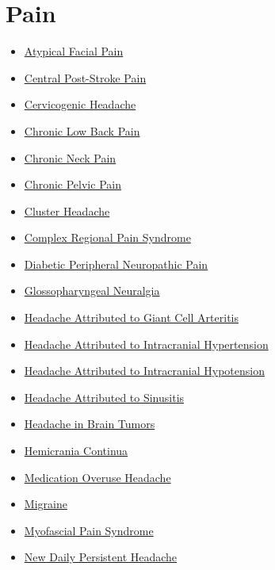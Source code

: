 \section*{Pain}
\label{sec:organ_pain}
\begin{itemize}[noitemsep]
  \item \hyperlink{sec:Atypical Facial Pain}{Atypical Facial Pain}
  \item \hyperlink{sec:Central Post-Stroke Pain}{Central Post-Stroke Pain}
  \item \hyperlink{sec:Cervicogenic Headache}{Cervicogenic Headache}
  \item \hyperlink{sec:Chronic Low Back Pain}{Chronic Low Back Pain}
  \item \hyperlink{sec:Chronic Neck Pain}{Chronic Neck Pain}
  \item \hyperlink{sec:Chronic Pelvic Pain}{Chronic Pelvic Pain}
  \item \hyperlink{sec:Cluster Headache}{Cluster Headache}
  \item \hyperlink{sec:Complex Regional Pain Syndrome}{Complex Regional Pain Syndrome}
  \item \hyperlink{sec:Diabetic Peripheral Neuropathic Pain}{Diabetic Peripheral Neuropathic Pain}
  \item \hyperlink{sec:Glossopharyngeal Neuralgia}{Glossopharyngeal Neuralgia}
  \item \hyperlink{sec:Headache Giant Cell Arteritis}{Headache Attributed to Giant Cell Arteritis}
  \item \hyperlink{sec:Headache Intracranial Hypertension}{Headache Attributed to Intracranial Hypertension}
  \item \hyperlink{sec:Headache Intracranial Hypotension}{Headache Attributed to Intracranial Hypotension}
  \item \hyperlink{sec:Headache Sinusitis}{Headache Attributed to Sinusitis}
  \item \hyperlink{sec:Headache Brain Tumors}{Headache in Brain Tumors}
  \item \hyperlink{sec:Hemicrania Continua}{Hemicrania Continua}
  \item \hyperlink{sec:Medication Overuse Headache}{Medication Overuse Headache}
  \item \hyperlink{sec:Migraine}{Migraine}
  \item \hyperlink{sec:Myofascial Pain Syndrome}{Myofascial Pain Syndrome}
  \item \hyperlink{sec:New Daily Persistent Headache}{New Daily Persistent Headache}

\end{itemize}
